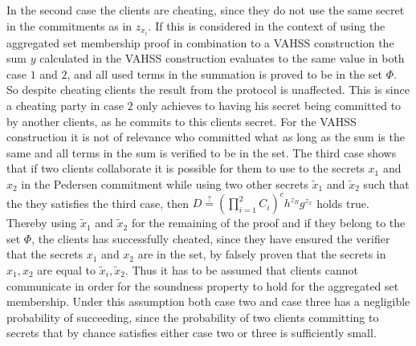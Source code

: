 In the second case the clients are cheating, since they do not use the same secret in the commitments as in $z_{x_i}$. If this is considered in the context of using the aggregated set membership proof in combination to a VAHSS construction the sum $y$ calculated in the VAHSS construction evaluates to the same value in both case $1$ and $2$, and all used terms in the summation is proved to be in the set $\Phi$. So despite cheating clients the result from the protocol is unaffected. This is since a cheating party in case $2$ only achieves to having his secret being committed to by another clients, as he commits to this clients secret. For the VAHSS construction it is not of relevance who committed what as long as the sum is the same and all terms in the sum is verified to be in the set. The third case shows that if two clients collaborate it is possible for them to use to the secrets $x_1$ and $x_2$ in the Pedersen commitment while using two other secrets $\tilde{x}_1$ and $\tilde{x}_2$ such that the they satisfies the third case, then $D\overset{?}{=} ( \prod_{i=1}^2 C_i)^ch^{z_R}g^{z_x}$ holds true. Thereby using $\tilde{x}_1$ and $\tilde{x}_2$ for the remaining of the proof and if they belong to the set $\Phi$, the clients has successfully cheated, since they have ensured the verifier that the secrets $x_1$ and $x_2$ are in the set, by falsely proven that the secrets in $x_1,x_2$ are equal to $\tilde{x}_i,\tilde{x}_2$. Thus it has to be assumed that clients cannot communicate in order for the soundness property to  hold for the aggregated set membership. Under this assumption both case two and case three has a negligible probability of succeeding, since the probability of two clients committing to secrets that by chance satisfies either case two or three is sufficiently small. %





